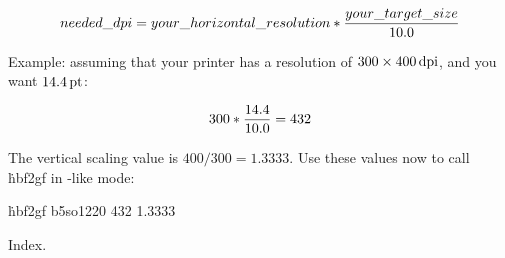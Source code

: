 $$ \\{needed\_dpi} = \\{your\_horizontal\_resolution} *
{\\{your\_target\_size} \over 10.0} $$

Example: assuming that your printer has a resolution of
$300\times400\,\hbox{dpi}$, and you want $14.4\,\hbox{pt}$:

$$ 300 * {14.4 \over 10.0} = 432 $$

The vertical scaling value is $400 / 300 = 1.3333$. Use these values now to
call \.{hbf2gf} in \mf-like mode:

\quad \.{hbf2gf b5so1220 432 1.3333}



\fi

Index.
\fi

\inx
\fin
\con
